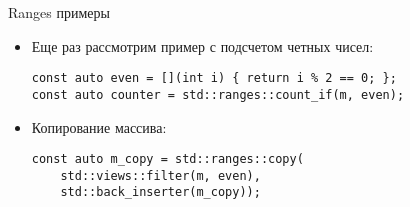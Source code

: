 \documentclass{beamer}
\begin{document}
\begin{frame}[fragile]{Ranges примеры}
    \begin{itemize}
        \item Еще раз рассмотрим пример с подсчетом четных чисел:
            \begin{lstlisting}
const auto even = [](int i) { return i % 2 == 0; };
const auto counter = std::ranges::count_if(m, even);
            \end{lstlisting}
        \item Копирование массива:
            \begin{lstlisting}
const auto m_copy = std::ranges::copy(
    std::views::filter(m, even),
    std::back_inserter(m_copy));
            \end{lstlisting}
    \end{itemize}
\end{frame}
\end{document}
